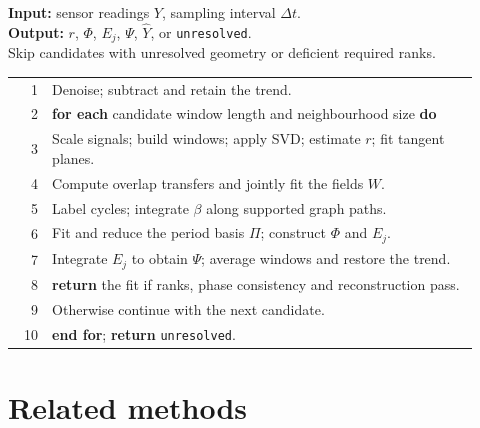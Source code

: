 \documentclass[11pt,a4paper]{article}
\begin{document}
\FloatBarrier
\begin{algorithm}[H]
\caption{TorusFlow}
\small
\textbf{Input:} sensor readings $Y$, sampling interval $\Delta t$.\\
\textbf{Output:} $r$, $\Phi$, $E_j$, $\Psi$, $\widehat Y$, or \texttt{unresolved}.\\
Skip candidates with unresolved geometry or deficient required ranks.
\par\smallskip
\begin{tabular}{@{}r@{\quad}p{0.92\linewidth}@{}}
1 & Denoise; subtract and retain the trend.\\
2 & \textbf{for each} candidate window length and neighbourhood size \textbf{do}\\
3 & \quad Scale signals; build windows; apply SVD; estimate $r$; fit tangent planes.\\
4 & \quad Compute overlap transfers and jointly fit the fields $W$.\\
5 & \quad Label cycles; integrate $\beta$ along supported graph paths.\\
6 & \quad Fit and reduce the period basis $\Pi$; construct $\Phi$ and $E_j$.\\
7 & \quad Integrate $E_j$ to obtain $\Psi$; average windows and restore the trend.\\
8 & \quad \textbf{return} the fit if ranks, phase consistency and reconstruction pass.\\
9 & \quad Otherwise continue with the next candidate.\\
10 & \textbf{end for}; \textbf{return} \texttt{unresolved}.\\
\end{tabular}
\end{algorithm}

\section*{Related methods}
\end{document}
